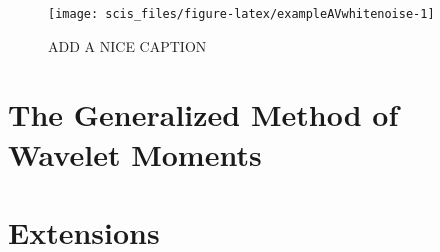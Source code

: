 \documentclass[]{book}
\theoremstyle{definition}
\theoremstyle{definition}
\theoremstyle{definition}
\theoremstyle{remark}
\begin{document}
\begin{figure}

{\centering \texttt{[image: scis\_files/figure-latex/exampleAVwhitenoise-1]} 

}

\caption{ADD A NICE CAPTION}\label{fig:exampleAVwhitenoise}
\end{figure}

\hypertarget{the-generalized-method-of-wavelet-moments}{%
\chapter{The Generalized Method of Wavelet
Moments}\label{the-generalized-method-of-wavelet-moments}}

\hypertarget{extensions}{%
\chapter{Extensions}\label{extensions}}


\end{document}
